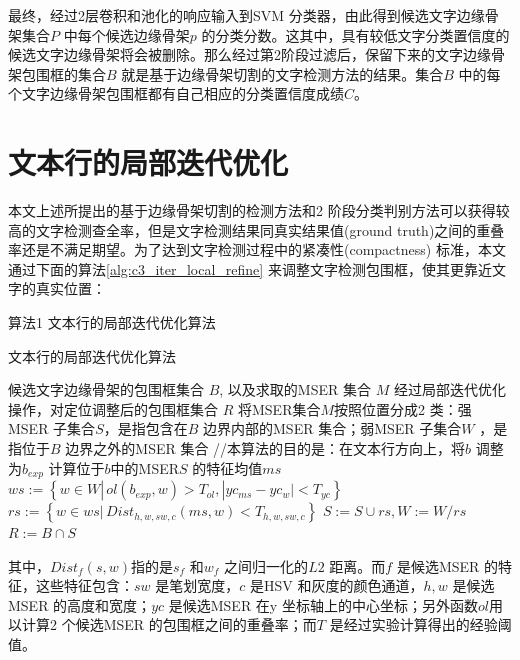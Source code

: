         最终，经过2层卷积和池化的响应输入到SVM 分类器，由此得到候选文字边缘骨架集合$P$ 中每个候选边缘骨架$p$ 的分类分数。这其中，具有较低文字分类置信度的候选文字边缘骨架将会被删除。那么经过第2阶段过滤后，保留下来的文字边缘骨架包围框的集合$B$ 就是基于边缘骨架切割的文字检测方法的结果。集合$B$ 中的每个文字边缘骨架包围框都有自己相应的分类置信度成绩$C$。

    \section{文本行的局部迭代优化}

    本文上述所提出的基于边缘骨架切割的检测方法和2 阶段分类判别方法可以获得较高的文字检测查全率，但是文字检测结果同真实结果值(ground truth)之间的重叠率还是不满足期望。为了达到文字检测过程中的紧凑性(compactness) 标准，本文通过下面的算法\ref{alg:c3_iter_local_refine} 来调整文字检测包围框，使其更靠近文字的真实位置：

    \qquad \qquad \qquad \qquad 算法1 文本行的局部迭代优化算法
    

    \begin{algorithm}[!h] \renewcommand{\algorithmicrequire}{\textbf{输入：}}
	\renewcommand{\algorithmicensure}{\textbf{输出：}}
	\caption{文本行的局部迭代优化算法}
	\label{alg:c3_iter_local_refine}
	\begin{algorithmic}[1]
		\REQUIRE 候选文字边缘骨架的包围框集合 $B$, 以及求取的MSER 集合 $M$
		\ENSURE 经过局部迭代优化操作，对定位调整后的包围框集合 $R$
		\STATE 将MSER集合$M$按照位置分成2 类：强MSER 子集合$S$，是指包含在$B$ 边界内部的MSER 集合；弱MSER 子集合$W$ ，是指位于$B$ 边界之外的MSER 集合
        \STATE //本算法的目的是：在文本行方向上，将$b$ 调整为$b_{exp}$
        \STATE 计算位于$b$中的MSER$S$ 的特征均值$ms$
		\REPEAT
        \STATE $ws:=\left\{ w \in W |\,ol(b_{exp},w)>T_{ol}, | yc_{ms}-yc_w|<T_{yc} \right\}$
        \STATE $rs:=\left\{ w \in ws |\,Dist_{h,w,sw,c}(ms,w)<T_{h,w,sw,c} \right\}$
        \STATE $S:=S\cup rs,W:=W / rs$
        \STATE $R:=B \cap S$
        \ENDFOR
	\end{algorithmic}
    \end{algorithm}

    其中，$Dist_f(s,w)$指的是$s_f$ 和$w_f$ 之间归一化的$L2$ 距离。而$f$ 是候选MSER 的特征，这些特征包含：$sw$ 是笔划宽度，$c$ 是HSV 和灰度的颜色通道，$h,w$ 是候选MSER 的高度和宽度；$yc$ 是候选MSER 在y 坐标轴上的中心坐标；另外函数$ol$用以计算2 个候选MSER 的包围框之间的重叠率；而$T$ 是经过实验计算得出的经验阈值。

